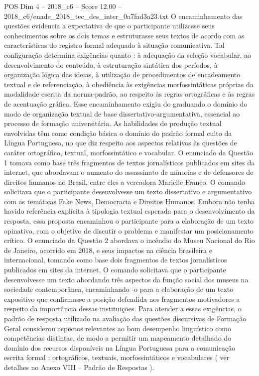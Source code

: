 \begin{textsample}{POS Dim 4 – 2018\_c6 – Score 12.00 – 2018\_c6/enade\_2018\_tec\_des\_inter\_0a7fad3a23.txt}
O encaminhamento das questões evidencia a expectativa de que o participante utilizasse seus conhecimentos sobre os dois temas e estruturasse seus textos de acordo com as características do registro formal adequado à situação comunicativa.
Tal configuração determina exigências quanto : à adequação da seleção vocabular, ao desenvolvimento do conteúdo, à estruturação sintática dos períodos, à organização lógica das ideias, à utilização de procedimentos de encadeamento textual e de referenciação, à obediência às exigências morfossintáticas próprias da modalidade escrita da norma-padrão, ao respeito às regras ortográficas e às regras de acentuação gráfica.
Esse encaminhamento exigiu do graduando o domínio do modo de organização textual de base dissertativo-argumentativa, essencial ao processo de formação universitária.
As habilidades de produção textual envolvidas têm como condição básica o domínio do padrão formal culto da Língua Portuguesa, no que diz respeito aos aspectos relativos às questões de caráter ortográfico, textual, morfossintático e vocabular.
O enunciado da Questão 1 tomava como base três fragmentos de textos jornalísticos publicados em sites da internet, que abordavam o aumento do assassinato de minorias e de defensores de direitos humanos no Brasil, entre eles a vereadora Marielle Franco.
O comando solicitava que o participante desenvolvesse um texto dissertativo e argumentativo com as temáticas Fake News, Democracia e Direitos Humanos.
Embora não tenha havido referência explícita à tipologia textual esperada para o desenvolvimento da resposta, essa proposta encaminhou o participante para a elaboração de um texto opinativo, com o objetivo de discutir o problema e manifestar um posicionamento crítico.
O enunciado da Questão 2 abordava o incêndio do Museu Nacional do Rio de Janeiro, ocorrido em 2018, e seus impactos na ciência brasileira e internacional, tomando como base dois fragmentos de textos jornalísticos publicados em sites da internet.
O comando solicitava que o participante desenvolvesse um texto abordando três aspectos da função social dos museus na sociedade contemporânea, encaminhando -o para a elaboração de um texto expositivo que confirmasse a posição defendida nos fragmentos motivadores a respeito da importância dessas instituições.
Para atender a essas exigências, o padrão de resposta utilizado na avaliação das questões discursivas de Formação Geral considerou aspectos relevantes ao bom desempenho linguístico como competências distintas, de modo a permitir um mapeamento detalhado do domínio dos recursos disponíveis na Língua Portuguesa para a comunicação escrita formal : ortográficos, textuais, morfossintáticos e vocabulares ( ver detalhes no Anexo VIII – Padrão de Respostas ).

\end{textsample}

